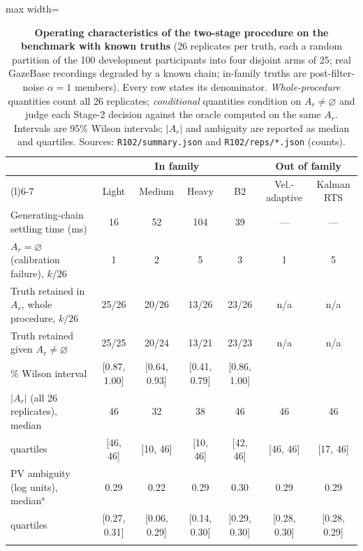 \begin{table}[ht]
\centering
\caption{\textbf{Operating characteristics of the two-stage procedure on the benchmark with known truths} (26 replicates per truth, each a random partition of the 100 development participants into four disjoint arms of 25; real GazeBase recordings degraded by a known chain; in-family truths are post-filter-noise $\alpha = 1$ members). Every row states its denominator. \emph{Whole-procedure} quantities count all 26 replicates; \emph{conditional} quantities condition on $A_r \ne \varnothing$ and judge each Stage-2 decision against the oracle computed on the same $A_r$. Intervals are 95\% Wilson intervals; $|A_r|$ and ambiguity are reported as median and quartiles. Sources: \texttt{R102/summary.json} and \texttt{R102/reps/*.json} (counts).}
\label{tab:benchmark}
\footnotesize
\setlength{\tabcolsep}{3pt}
\begin{adjustbox}{max width=\textwidth}
\begin{tabular}{@{}>{\raggedright\arraybackslash}p{5.6cm}cccccc@{}}
\toprule
 & \multicolumn{4}{c}{In family} & \multicolumn{2}{c}{Out of family} \\
\cmidrule(lr){2-5}\cmidrule(l){6-7}
 & Light & Medium & Heavy & B2 & Vel.-adaptive & Kalman RTS \\
\midrule
Generating-chain settling time (ms) & 16 & 52 & 104 & 39 & --- & --- \\
$A_r = \varnothing$ (calibration failure), $k/26$ & 1 & 2 & 5 & 3 & 1 & 5 \\
Truth retained in $A_r$, whole procedure, $k/26$ & 25/26 & 20/26 & 13/26 & 23/26 & n/a & n/a \\
Truth retained given $A_r \ne \varnothing$ & 25/25 & 20/24 & 13/21 & 23/23 & n/a & n/a \\
\quad 95\% Wilson interval & [0.87, 1.00] & [0.64, 0.93] & [0.41, 0.79] & [0.86, 1.00] &  &  \\
$|A_r|$ (all 26 replicates), median & 46 & 32 & 38 & 46 & 46 & 46 \\
\quad quartiles & [46, 46] & [10, 46] & [10, 46] & [42, 46] & [46, 46] & [17, 46] \\
PV ambiguity (log units), median$^{a}$ & 0.29 & 0.22 & 0.29 & 0.30 & 0.29 & 0.29 \\
\quad quartiles & [0.27, 0.31] & [0.06, 0.29] & [0.14, 0.30] & [0.29, 0.30] & [0.28, 0.30] & [0.28, 0.29] \\
\addlinespace
\multicolumn{7}{@{}l}{\textit{Stage-2 decisions, $k/\#\{A_r \ne \varnothing\}$}} \\

\end{tabular}
\end{adjustbox}
\end{table}
